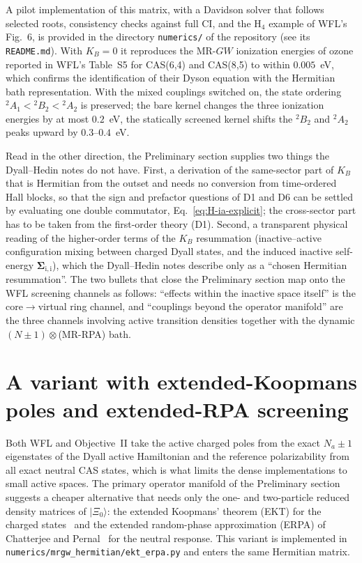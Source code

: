 \documentclass[11pt,a4paper]{article}
\newcommand{\bSigma}{\boldsymbol{\Sigma}}
\newcommand{\ket}[1]{|#1\rangle}
\newcommand{\MRGW}{MR-$GW$}
\newcommand{\WFL}{WFL}
\newcommand{\Pre}{Preliminary section}
\newcommand{\DHN}{Dyall--Hedin notes}
\begin{document}
A pilot implementation of this matrix, with a Davidson solver that follows
selected roots, consistency checks against full CI, and the H$_4$ example of
\WFL{}'s Fig.~6, is provided in the directory \texttt{numerics/} of the
repository (see its \texttt{README.md}).  With $K_B=0$ it reproduces the
\MRGW{} ionization energies of ozone reported in \WFL{}'s Table~S5 for
CAS(6,4) and CAS(8,5) to within $0.005$~eV, which confirms the identification
of their Dyson equation with the Hermitian bath representation.  With the
mixed couplings switched on, the state ordering $^2A_1<{}^2B_2<{}^2A_2$ is
preserved; the bare kernel changes the three ionization energies by at most
$0.2$~eV, the statically screened kernel shifts the $^2B_2$ and $^2A_2$ peaks
upward by $0.3$--$0.4$~eV.

Read in the other direction, the \Pre{} supplies two things the \DHN{} do not
have.  First, a derivation of the same-sector part of $K_B$ that is Hermitian
from the outset and needs no conversion from time-ordered Hall blocks, so that
the sign and prefactor questions of D1 and D6 can be settled by evaluating one
double commutator, Eq.~\eqref{eq:H-ia-explicit}; the cross-sector part has to
be taken from the first-order theory (D1).  Second, a transparent
physical reading of the higher-order terms of the $K_B$ resummation
(inactive--active configuration mixing between charged Dyall states, and the
induced inactive self-energy $\bSigma_{\mathrm{i,i}}$), which the \DHN{}
describe only as a ``chosen Hermitian resummation''.  The two bullets that
close the \Pre{} map onto the \WFL{} screening channels as follows: ``effects
within the inactive space itself'' is the core$\to$virtual ring channel, and
``couplings beyond the operator manifold'' are the three channels involving
active transition densities together with the dynamic
$(N\pm1)\otimes$(MR-RPA) bath.

\section{A variant with extended-Koopmans poles and extended-RPA screening}
\label{sec:ekt-erpa}

Both \WFL{} and Objective~II take the active charged poles from the exact
$N_a\pm1$ eigenstates of the Dyall active Hamiltonian and the reference
polarizability from all exact neutral CAS states, which is what limits the
dense implementations to small active spaces.  The primary operator
manifold of the \Pre{} suggests a cheaper alternative that needs only the
one- and two-particle reduced density matrices of $\ket{\Xi_0}$: the
extended Koopmans' theorem (EKT) for the charged states~\cite{EKT1974,EKT1975}
and the extended random-phase approximation (ERPA) of Chatterjee and
Pernal~\cite{ChatterjeePernal2012} for the neutral response.  This variant
is implemented in \texttt{numerics/mrgw\_hermitian/ekt\_erpa.py} and enters
the same Hermitian matrix.
\end{document}
